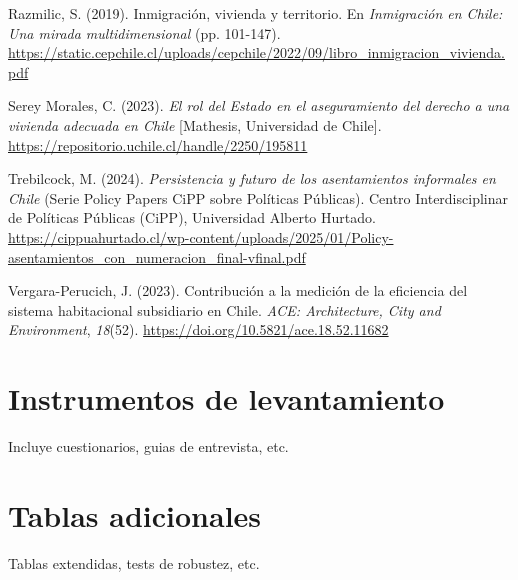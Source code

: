 \documentclass[
  spanish,
  a4paper,
  oneside]{scrbook}
\newlength{\cslhangindent}
\newenvironment{CSLReferences}[2] %
 {\begin{list}{}{%
  \setlength{\itemindent}{0pt}
  \setlength{\leftmargin}{0pt}
  \setlength{\parsep}{0pt}
  \ifodd #1
   \setlength{\leftmargin}{\cslhangindent}
   \setlength{\itemindent}{-1\cslhangindent}
  \fi
  \setlength{\itemsep}{#2\baselineskip}}}
 {\end{list}}
\begin{document}
\begin{CSLReferences}{1}{0}
Razmilic, S. (2019). Inmigración, vivienda y territorio. En
\emph{Inmigración en {Chile}: Una mirada multidimensional} (pp.
101-147).
\url{https://static.cepchile.cl/uploads/cepchile/2022/09/libro_inmigracion_vivienda.pdf}

Serey Morales, C. (2023). \emph{El rol del {Estado} en el aseguramiento
del derecho a una vivienda adecuada en {Chile}} {[}Mathesis, Universidad
de Chile{]}. \url{https://repositorio.uchile.cl/handle/2250/195811}

Trebilcock, M. (2024). \emph{Persistencia y futuro de los asentamientos
informales en {Chile}} (Serie Policy Papers CiPP sobre Políticas
Públicas). Centro Interdisciplinar de Políticas Públicas ({CiPP}),
Universidad Alberto Hurtado.
\url{https://cippuahurtado.cl/wp-content/uploads/2025/01/Policy-asentamientos_con_numeracion_final-vfinal.pdf}

Vergara-Perucich, J. (2023). Contribución a la medición de la eficiencia
del sistema habitacional subsidiario en {Chile}. \emph{{ACE}:
Architecture, City and Environment}, \emph{18}(52).
\url{https://doi.org/10.5821/ace.18.52.11682}

\end{CSLReferences}

\cleardoublepage
{}
{}
\appendix

\chapter{Instrumentos de
levantamiento}\label{instrumentos-de-levantamiento}

Incluye cuestionarios, guias de entrevista, etc.

\chapter{Tablas adicionales}\label{tablas-adicionales}

Tablas extendidas, tests de robustez, etc.


\backmatter

\mainmatter
\pagestyle{scrheadings}

\end{document}
